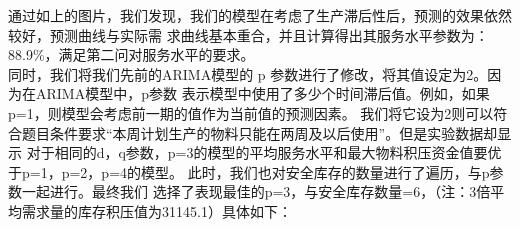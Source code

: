 \documentclass{cumcmthesis}
\begin{document}
        通过如上的图片，我们发现，我们的模型在考虑了生产滞后性后，预测的效果依然较好，预测曲线与实际需
        求曲线基本重合，并且计算得出其服务水平参数为：88.9\%，满足第二问对服务水平的要求。\\

        同时，我们将我们先前的ARIMA模型的 p 参数进行了修改，将其值设定为2。因为在ARIMA模型中，p参数
        表示模型中使用了多少个时间滞后值。例如，如果 p=1，则模型会考虑前一期的值作为当前值的预测因素。
        我们将它设为2则可以符合题目条件要求“本周计划生产的物料只能在两周及以后使用”。但是实验数据却显示
        对于相同的d，q参数，p=3的模型的平均服务水平和最大物料积压资金值要优于p=1，p=2，p=4的模型。
        此时，我们也对安全库存的数量进行了遍历，与p参数一起进行。最终我们
        选择了表现最佳的p=3，与安全库存数量=6，（注：3倍平均需求量的库存积压值为31145.1）具体如下：\\
\end{document}
